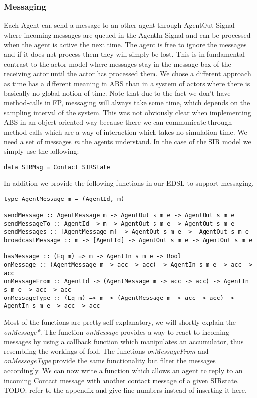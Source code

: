 \subsubsection{Messaging}
Each Agent can send a message to an other agent through AgentOut-Signal where incoming messages are queued in the AgentIn-Signal and can be processed when the agent is active the next time. The agent is free to ignore the messages and if it does not process them they will simply be lost. This is in fundamental contrast to the actor model where messages stay in the message-box of the receiving actor until the actor has processed them. We chose a different approach as time has a different meaning in ABS than in a system of actors where there is basically no global notion of time.
Note that due to the fact we don't have method-calls in FP, messaging will always take some time, which depends on the sampling interval of the system. This was not obviously clear when implementing ABS in an object-oriented way because there we can communicate through method calls which are a way of interaction which takes no simulation-time.
We need a set of messages \textit{m} the agents understand. In the case of the SIR model we simply use the following:

\begin{verbatim}
data SIRMsg = Contact SIRState
\end{verbatim}

In addition we provide the following functions in our EDSL to support messaging.

\begin{verbatim}
type AgentMessage m = (AgentId, m)

sendMessage :: AgentMessage m -> AgentOut s m e -> AgentOut s m e
sendMessageTo :: AgentId -> m -> AgentOut s m e -> AgentOut s m e
sendMessages :: [AgentMessage m] -> AgentOut s m e ->  AgentOut s m e
broadcastMessage :: m -> [AgentId] -> AgentOut s m e -> AgentOut s m e

hasMessage :: (Eq m) => m -> AgentIn s m e -> Bool
onMessage :: (AgentMessage m -> acc -> acc) -> AgentIn s m e -> acc -> acc
onMessageFrom :: AgentId -> (AgentMessage m -> acc -> acc) -> AgentIn s m e -> acc -> acc
onMessageType :: (Eq m) => m -> (AgentMessage m -> acc -> acc) -> AgentIn s m e -> acc -> acc
\end{verbatim}

Most of the functions are pretty self-explanatory, we will shortly explain the \textit{onMessage*}. The function \textit{onMessage} provides a way to react to incoming messages by using a callback function which manipulates an accumulator, thus resembling the workings of fold. The functions \textit{onMessageFrom} and \textit{onMessageType} provide the same functionality but filter the messages accordingly. We can now write a function which allows an agent to reply to an incoming Contact message with another contact message of a given SIRstate. TODO: refer to the appendix and give line-numbers instead of inserting it here.

